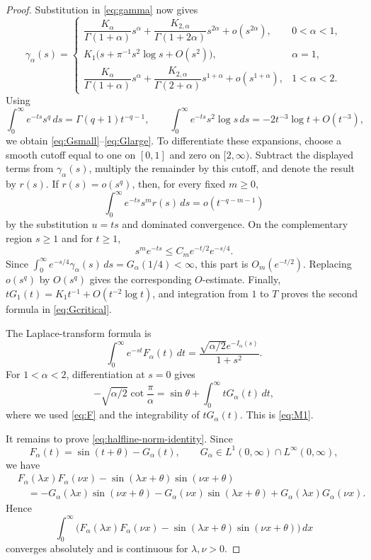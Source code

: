 \documentclass[11pt]{amsart}
\numberwithin{equation}{section}
\theoremstyle{remark}
\begin{document}
\begin{proof}
Substitution in \eqref{eq:gamma} now gives
\[
 \gamma_\alpha(s)=
 \begin{cases}
 \dfrac{K_\alpha}{\Gamma(1+\alpha)}s^\alpha
 +\dfrac{K_{2,\alpha}}{\Gamma(1+2\alpha)}s^{2\alpha}
 +o(s^{2\alpha}),&0<\alpha<1,\\[2mm]
 K_1\bigl(s+\pi^{-1}s^2\log s+O(s^2)\bigr),&\alpha=1,\\[2mm]
 \dfrac{K_\alpha}{\Gamma(1+\alpha)}s^\alpha
 +\dfrac{K_{2,\alpha}}{\Gamma(2+\alpha)}s^{1+\alpha}
 +o(s^{1+\alpha}),&1<\alpha<2.
 \end{cases}
\]
Using
\[
 \int_0^\infty e^{-ts}s^q\,ds=\Gamma(q+1)t^{-q-1},
 \qquad
 \int_0^\infty e^{-ts}s^2\log s\,ds
 =-2t^{-3}\log t+O(t^{-3}),
\]
we obtain \eqref{eq:Gsmall}--\eqref{eq:Glarge}.  To differentiate these
expansions, choose a smooth cutoff equal to one on $[0,1]$ and zero on
$[2,\infty)$.  Subtract the displayed terms from $\gamma_\alpha(s)$,
multiply the remainder by this cutoff, and denote the result by $r(s)$.  If $r(s)=o(s^q)$, then, for every fixed $m\ge0$,
\[
 \int_0^\infty e^{-ts}s^m r(s)\,ds=o(t^{-q-m-1})
\]
by the substitution $u=ts$ and dominated convergence.  On the complementary
region $s\ge1$ and for $t\ge1$,
\[
 s^m e^{-ts}\le C_m e^{-t/2}e^{-s/4}.
\]
Since $\int_0^\infty e^{-s/4}\gamma_\alpha(s)\,ds=G_\alpha(1/4)<\infty$,
this part is $O_m(e^{-t/2})$.  Replacing $o(s^q)$ by $O(s^q)$ gives the
corresponding $O$-estimate.  Finally,
$tG_1(t)=K_1t^{-1}+O(t^{-2}\log t)$, and integration from $1$ to $T$ proves
the second formula in \eqref{eq:Gcritical}.

The Laplace-transform formula
\cite[Theorem~1.1, equation~(1.1)]{KwasnickiHalfLine} is
\begin{equation}\label{eq:F-Laplace}
 \int_0^\infty e^{-st}F_\alpha(t)\,dt
 =\frac{\sqrt{\alpha/2}e^{-I_\alpha(s)}}{1+s^2}.
\end{equation}
For $1<\alpha<2$, differentiation at $s=0$ gives
\[
 -\sqrt{\alpha/2}\cot\frac{\pi}{\alpha}
 =\sin\theta+\int_0^\infty tG_\alpha(t)\,dt,
\]
where we used \eqref{eq:F} and the integrability of $tG_\alpha(t)$.  This is
\eqref{eq:M1}.

It remains to prove \eqref{eq:halfline-norm-identity}.  Since
\[
F_\alpha(t)=\sin(t+\theta)-G_\alpha(t),
\qquad
G_\alpha\in L^1(0,\infty)\cap L^\infty(0,\infty),
\]
we have
\[
\begin{aligned}
	&F_\alpha(\lambda x)F_\alpha(\nu x)
	-\sin(\lambda x+\theta)\sin(\nu x+\theta)\\
	&\quad=
	-G_\alpha(\lambda x)\sin(\nu x+\theta)
	-G_\alpha(\nu x)\sin(\lambda x+\theta)
	+G_\alpha(\lambda x)G_\alpha(\nu x).
\end{aligned}
\]
Hence
\[
\int_0^\infty
\bigl(
F_\alpha(\lambda x)F_\alpha(\nu x)
-
\sin(\lambda x+\theta)\sin(\nu x+\theta)
\bigr)\,dx
\]
converges absolutely and is continuous for \(\lambda,\nu>0\).


\end{proof}
\end{document}
